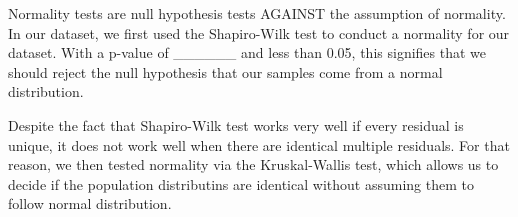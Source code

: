 \par \indent Normality tests are null hypothesis tests AGAINST the assumption 
of normality. In our dataset, we first used the Shapiro-Wilk test to conduct a 
normality for our dataset. With a p-value of ______ and less than 0.05, this
signifies that we should reject the null hypothesis that our samples come from
a normal distribution. 

\par Despite the fact that Shapiro-Wilk test works very well if every residual 
is unique, it does not work well when there are identical multiple residuals. 
For that reason, we then tested normality via the Kruskal-Wallis test, which 
allows us to decide if the population distributins are identical without assuming 
them to follow normal distribution. 

